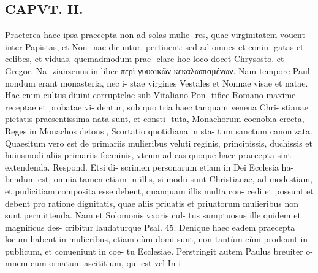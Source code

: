 \documentclass{article}
\begin{document}
\begin{pages}
\section*{CAPVT. II. }
\marginpar{[ p.79 ]}\pstart Praeterea haec ipsa praecepta non ad solas mulie- res, quae virginitatem vouent inter Papistas, et Non- nae dicuntur, pertinent: sed ad omnes et coniu- gatas et celibes, et viduas, quemadmodum prae- clare hoc loco docet Chrysosto. et Gregor. Na- zianzenus in liber  περὶ γυυαικῶν κεκαλωπισμένων. Nam tempore Pauli nondum erant monasteria, nec i- stae virgines Vestales et Nonnae visae et natae. Hae enim cultus diuini corruptelae sub Vitaliano Pon- tifice Romano maxime receptae et probatae vi- dentur, sub quo tria haec tanquam venena Chri- stianae pietatis praesentissima nata sunt, et consti- tuta, Monachorum coenobia erecta, Reges in Monachos detonsi, Scortatio quotidiana in sta- tum sanctum canonizata.  \pend\pstart Quaesitum vero est de primariis mulieribus veluti reginis, principissis, duchissis et huiusmodi aliis primariis foeminis, vtrum ad eas quoque haec praecepta sint extendenda. Respond. Etsi di- scrimen personarum etiam in Dei Ecclesia ha- bendum est, omnia tamen etiam in illis, si modu sunt Christianae, ad modestiam, et pudicitiam composita esse debent, quanquam illis multa con- cedi et possunt et debent pro ratione dignitatis, quae aliis priuatis et priuatorum mulieribus non sunt permittenda. Nam et Solomonis vxoris cul- tus sumptuosus ille quidem et magnificus des- cribitur laudaturque Psal. 45.  \pend\pstart Denique haec eadem praecepta locum habent in mulieribus, etiam cùm domi sunt, non tantùm cùm prodeunt in publicum, et conueniunt in coe- tu Ecclesiae. Perstringit autem Paulus breuiter o- mnem eum ornatum ascititium, qui est vel In i-  \pend

\end{pages}
\end{document}
